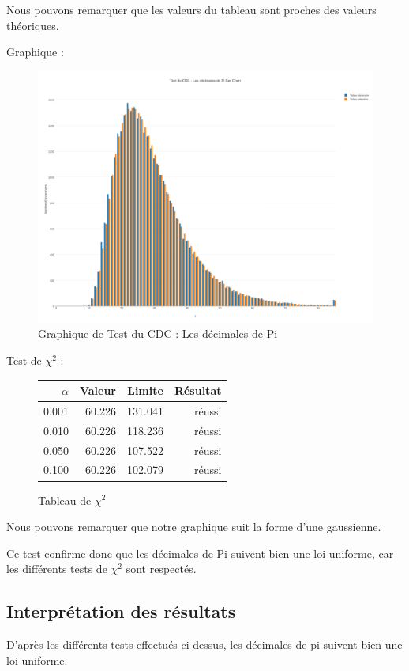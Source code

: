 \documentclass[10pt,a4paper]{article}
\begin{document}
\newpage
Nous pouvons remarquer que les valeurs du tableau sont proches des valeurs théoriques.

\newpage
Graphique :
\begin{figure}[h]
\centering
\includegraphics[scale=0.25]{../chart_images/test_du_cdc___les_decimales_de_pi_bar_chart.png}
\caption{Graphique de Test du CDC : Les décimales de Pi}
\end{figure}

Test de $\chi^2$ :
\begin{figure}[h]
\centering
\begin{tabular}{|r|r|r|r|}
\hline
$\alpha$ & Valeur & Limite & Résultat\\
\hline
0.001 & 60.226 & 131.041 & réussi\\
0.010 & 60.226 & 118.236 & réussi\\
0.050 & 60.226 & 107.522 & réussi\\
0.100 & 60.226 & 102.079 & réussi\\
\hline
\end{tabular}
\caption{Tableau de $\chi^2$}
\end{figure}

Nous pouvons remarquer que notre graphique suit la forme d'une gaussienne.

Ce test confirme donc que les décimales de Pi suivent bien une loi uniforme, car les différents tests de $\chi^2$ sont respectés.

\subsection{Interprétation des résultats}
D'après les différents tests effectués ci-dessus, les décimales de pi suivent bien une loi uniforme.
	
\end{document}
